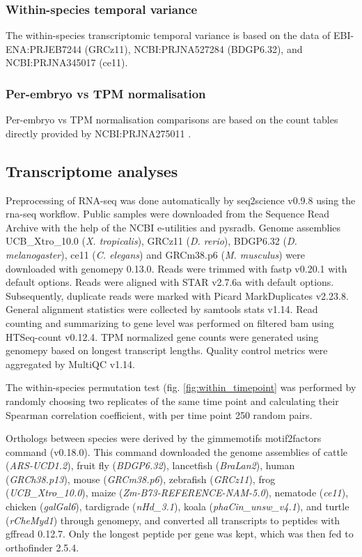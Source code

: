 \subsubsection{Within-species temporal variance}

The within-species transcriptomic temporal variance is based on the data of EBI-ENA:PRJEB7244 \cite{White2017} (GRCz11), NCBI:PRJNA527284 \cite{Liu2021} (BDGP6.32), and NCBI:PRJNA345017 \cite{Zalts2017} (ce11).

\subsubsection{Per-embryo vs TPM normalisation}

Per-embryo vs TPM normalisation comparisons are based on the count tables directly provided by NCBI:PRJNA275011 \cite{Owens2016}.

\subsection{Transcriptome analyses}

Preprocessing of RNA-seq was done automatically by seq2science v0.9.8\cite{seq2science} using the rna-seq workflow. Public samples were downloaded from the Sequence Read Archive with the help of the NCBI e-utilities and pysradb\cite{Choudhary2019}. Genome assemblies UCB\_Xtro\_10.0 (\textit{X. tropicalis}), GRCz11 (\textit{D. rerio}), BDGP6.32 (\textit{D. melanogaster}), ce11 (\textit{C. elegans}) and GRCm38.p6 (\textit{M. musculus}) were downloaded with genomepy 0.13.0\cite{Frlich2023}. Reads were trimmed with fastp v0.20.1\cite{Chen2018} with default options. Reads were aligned with STAR v2.7.6a\cite{Dobin2012} with default options. Subsequently, duplicate reads were marked with Picard MarkDuplicates v2.23.8\cite{picard}. General alignment statistics were collected by samtools stats v1.14\cite{Danecek2021}. Read counting and summarizing to gene level was performed on filtered bam using HTSeq-count v0.12.4\cite{Anders2014}. TPM normalized gene counts were generated using genomepy based on longest transcript lengths. Quality control metrics were aggregated by MultiQC v1.14\cite{Ewels2016}. 

The within-species permutation test (fig. \ref{fig:within_timepoint} was performed by randomly choosing two replicates of the same time point and calculating their Spearman correlation coefficient, with per time point 250 random pairs.

Orthologs between species were derived by the gimmemotifs motif2factors command (v0.18.0). This command downloaded the genome assemblies of cattle (\textit{ARS-UCD1.2}), fruit fly (\textit{BDGP6.32}), lancetfish (\textit{BraLan2}), human (\textit{GRCh38.p13}), mouse (\textit{GRCm38.p6}), zebrafish (\textit{GRCz11}), frog (\textit{UCB\_Xtro\_10.0}), maize (\textit{Zm-B73-REFERENCE-NAM-5.0}), nematode (\textit{ce11}), chicken (\textit{galGal6}), tardigrade (\textit{nHd\_3.1}),	koala (\textit{phaCin\_unsw\_v4.1}), and turtle (\textit{rCheMyd1}) through genomepy\cite{Frlich2023}, and converted all transcripts to peptides with gffread 0.12.7\cite{Pertea2020}. Only the longest peptide per gene was kept, which was then fed to orthofinder 2.5.4\cite{Emms2019}.

